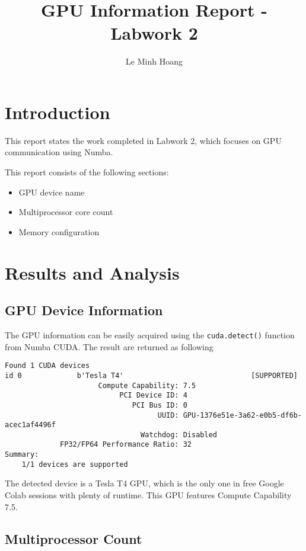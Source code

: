 \documentclass[12pt,a4paper]{cibb}
\title{\Large $\ $\\ \bf GPU Information Report - Labwork 2}
\author{\large Le Minh Hoang}
\begin{document}
\renewcommand{\thefootnote}{}
\thispagestyle{myheadings}
\pagestyle{myheadings}
\section{Introduction}
\label{sec:SCIENTIFIC-BACKGROUND}
This report states the work completed in Labwork 2, which focuses on GPU communication using Numba.

This report consists of the following sections:
\begin{itemize}
    \item GPU device name
    \item Multiprocessor core count
    \item Memory configuration
\end{itemize}

\section{Results and Analysis}
\label{sec:CONCLUSIONS}

\subsection{GPU Device Information}
The GPU information can be easily acquired using the \verb|cuda.detect()| function from Numba CUDA. The result are returned as following

\begin{lstlisting}
Found 1 CUDA devices
id 0             b'Tesla T4'                              [SUPPORTED]
                      Compute Capability: 7.5
                           PCI Device ID: 4
                              PCI Bus ID: 0
                                    UUID: GPU-1376e51e-3a62-e0b5-df6b-acec1af4496f
                                Watchdog: Disabled
             FP32/FP64 Performance Ratio: 32
Summary:
	1/1 devices are supported
\end{lstlisting}

The detected device is a Tesla T4 GPU, which is the only one in free Google Colab sessions with plenty of runtime. This GPU features Compute Capability 7.5.

\subsection{Multiprocessor Count}
\end{document}
